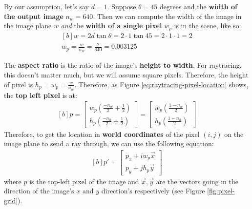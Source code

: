 \documentclass{article}
\begin{document}
By our assumption, let's say $d = 1$. Suppose $\theta = 45$ degrees and the \textbf{width of the output image} $n_w = 640$. Then we can compute the width of the image in the image plane $w$ \textit{and} the \textbf{width of a single pixel} $w_p$ is in the scene, like so:
\begin{equation}
\begin{aligned}[b]
	w = 2 d \tan \theta = 2 \cdot 1 \tan 45 = 2 \cdot 1 \cdot 1 = 2 \\
	w_p = \frac{w}{n_w} = \frac{2}{640} = 0.003125
\end{aligned}
\end{equation}

The \textbf{aspect ratio} is the ratio of the image's \textbf{height to width}. For raytracing, this doesn't matter much, but we will assume square pixels. Therefore, the height of pixel is $h_p = w_p = \frac{w}{n_w}$. Therefore, as Figure \ref{eq:raytracing-pixel-location} shows, the \textbf{top left pixel} is at:
\begin{equation}
	\begin{aligned}[b]
	p = \left[ \begin{matrix}
		w_p\left( \frac{-n_w}{2} + \frac{1}{2} \right) \\
		h_p\left( \frac{-n_h}{2} + \frac{1}{2} \right)
	\end{matrix}\right]
	= \left[ \begin{matrix}
		w_p\left( \frac{1 - n_w}{2} \right) \\
		h_p\left( \frac{1 - n_h}{2} \right)
	\end{matrix}\right]
	\end{aligned}
\end{equation}
Therefore, to get the location in \textbf{world coordinates} of the pixel $(i,j)$ on the image plane to send a ray through, we can use the following equation:
\begin{equation}
	\begin{aligned}[b]
	p'= \left[ \begin{matrix}
		p_x + i w_p \vec{x} \\
		p_y + j h_p \vec{y}
	\end{matrix}\right]
	\end{aligned}
	\label{eq:pixel-centre-raytracing}
\end{equation}
where $p$ is the top-left pixel of the image and $\vec{x},\vec{y}$ are the vectors going in the direction of the image's $x$ and $y$ direction's respectively (see Figure \ref{fig:pixel-grid}).
\end{document}

